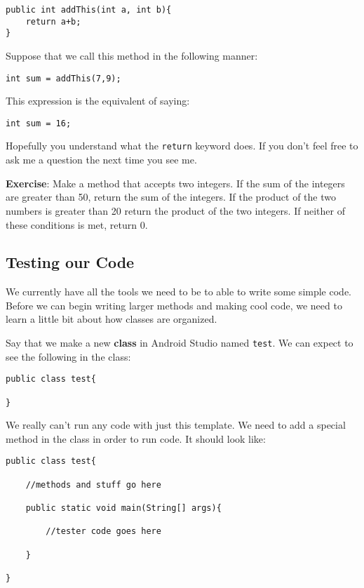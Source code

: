 \documentclass[11pt,fleqn]{article}
\begin{document}
\begin{verbatim}
public int addThis(int a, int b){
    return a+b;
}
\end{verbatim}  

Suppose that we call this method in the following manner:

\begin{verbatim}
int sum = addThis(7,9);
\end{verbatim} 
 
This expression is the equivalent of saying:

\begin{verbatim}
int sum = 16;
\end{verbatim}

Hopefully you understand what the \texttt{return} keyword does. If you don't
feel free to ask me a question the next time you see me. 

\textbf{Exercise}: Make a method that accepts two integers. If the sum of the
integers are greater than 50, return the sum of the integers. If the product of
the two numbers is greater than 20 return the product of the two integers. If
neither of these conditions is met, return 0.

\begin{center}
\section*{Testing our Code}
\end{center}

We currently have all the tools we need to be to able to write some simple code.
Before we can begin writing larger methods and making cool code, we need to
learn a little bit about how classes are organized. 

Say that we make a new \textbf{class} in Android Studio named \texttt{test}. We
can expect to see the following in the class:

\begin{verbatim}
public class test{

}
\end{verbatim}

We really can't run any code with just this template. We need to add a special
method in the class in order to run code. It should look like:

\begin{verbatim}
public class test{
    
    //methods and stuff go here    
    
    public static void main(String[] args){
        
        //tester code goes here    

    }    

}
\end{verbatim}
\end{document}
